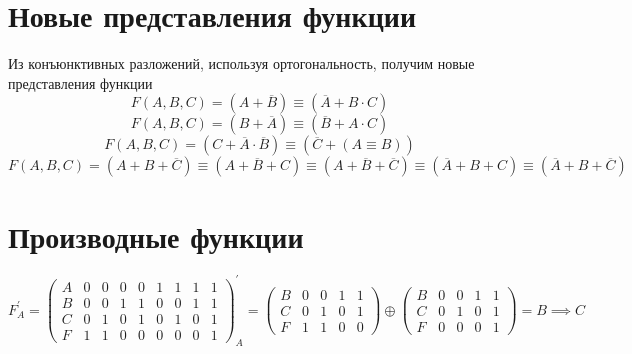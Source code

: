 \documentclass[a4paper,10pt]{article} %
\begin{document}
	\section{Новые представления функции}
	Из конъюнктивных разложений, используя ортогональность, получим новые представления функции
	\begin{equation}
		F(A, B, C) = (A + \overline{B}) \equiv (\overline{A} + B \cdot C)
	\end{equation}
	\begin{equation}
		F(A, B, C) = (B + \overline{A}) \equiv (\overline{B} + A \cdot C)
	\end{equation}
	\begin{equation}
		F(A, B, C) = (C + \overline{A} \cdot \overline{B}) \equiv
		(\overline{C} + (A \equiv B)) 
	\end{equation}
	\begin{equation}
		F(A, B, C) = (A + B + \overline{C}) \equiv
		(A + \overline{B} + C) \equiv (A + \overline{B} + \overline{C}) \equiv
		(\overline{A} + B + C) \equiv (\overline{A} + B + \overline{C})
	\end{equation}
	
	\section{Производные функции}
	
	\begin{equation}
		F^{\prime}_{A} = 
		\left(
		\begin{smallmatrix}
			A & 0 & 0 & 0 & 0 & 1 & 1 & 1 & 1 \\
			B & 0 & 0 & 1 & 1 & 0 & 0 & 1 & 1 \\
			C & 0 & 1 & 0 & 1 & 0 & 1 & 0 & 1 \\
			F & 1 & 1 & 0 & 0 & 0 & 0 & 0 & 1
		\end{smallmatrix}
		\right)^{\prime}_{A} = 
		\left(
		\begin{smallmatrix}
			B & 0 & 0 & 1 & 1 \\
			C & 0 & 1 & 0 & 1 \\
			F & 1 & 1 & 0 & 0
		\end{smallmatrix} 
		\right) \oplus \left(
		\begin{smallmatrix}
			B & 0 & 0 & 1 & 1 \\
			C & 0 & 1 & 0 & 1 \\
			F & 0 & 0 & 0 & 1
		\end{smallmatrix}
		\right)
		= B \implies C
	\end{equation}
	
\end{document}
